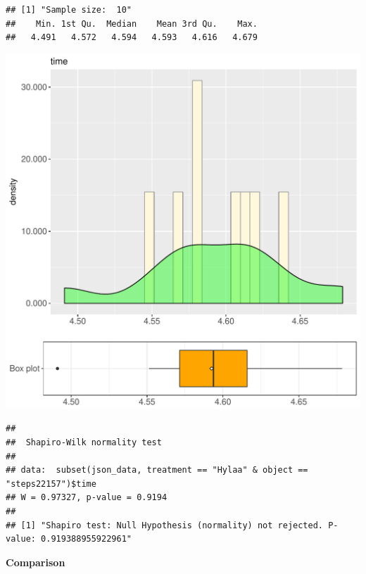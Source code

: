 \documentclass{article}\usepackage[]{graphicx}\usepackage[]{color}
\makeatletter
\def\maxwidth{ %
  \ifdim\Gin@nat@width>\linewidth
    \linewidth
  \else
    \Gin@nat@width
  \fi
}
\newenvironment{kframe}{%
 \def\at@end@of@kframe{}%
 \ifinner\ifhmode%
  \def\at@end@of@kframe{\end{minipage}}%
  \begin{minipage}{\columnwidth}%
 \fi\fi%
 \def\FrameCommand##1{\hskip\@totalleftmargin \hskip-\fboxsep
 \colorbox{shadecolor}{##1}\hskip-\fboxsep
     \hskip-\linewidth \hskip-\@totalleftmargin \hskip\columnwidth}%
 \MakeFramed {\advance\hsize-\width
   \@totalleftmargin\z@ \linewidth\hsize
   \@setminipage}}%
 {\par\unskip\endMakeFramed%
 \at@end@of@kframe}
\newenvironment{knitrout}{}{} %
\makeatother
\begin{document}
\begin{knitrout}
\color{fgcolor}\begin{kframe}
\begin{verbatim}
## [1] "Sample size:  10"
##    Min. 1st Qu.  Median    Mean 3rd Qu.    Max. 
##   4.491   4.572   4.594   4.593   4.616   4.679
\end{verbatim}
\end{kframe}
\includegraphics[width=\maxwidth]{figure/RH2_Hylaa_steps22157-1} 
\begin{kframe}\begin{verbatim}
## 
## 	Shapiro-Wilk normality test
## 
## data:  subset(json_data, treatment == "Hylaa" & object == "steps22157")$time
## W = 0.97327, p-value = 0.9194
## 
## [1] "Shapiro test: Null Hypothesis (normality) not rejected. P-value: 0.919388955922961"
\end{verbatim}
\end{kframe}
\end{knitrout}
  
 \textbf{Comparison}
  
\end{document}
